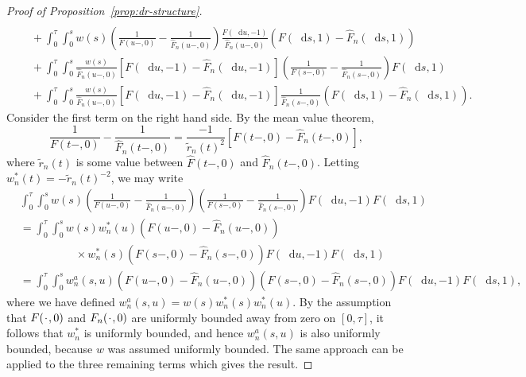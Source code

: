 \documentclass[11pt]{article}
\theoremstyle{thmstyleone}%
\theoremstyle{thmstyletwo}%
\theoremstyle{thmstylethree}%
\newcommand{\blank}{\makebox[1ex]{\textbf{$\cdot$}}}
\newcommand*\diff{\mathop{}\!\mathrm{d}}
\newcommand{\1}{\mathds{1}}
\begin{document}
\begin{proof}[Proof of Proposition~\ref{prop:dr-structure}]
\begin{align*}
      \\
      & \quad +
        \int_0^{\tau}
        \int_0^s
        w(s) 
        \left(
        \frac{1}{F(u-, 0)} -  \frac{1}{\hat{F}_n(u-, 0)}
        \right) \frac{F(\diff u, -1) }{\hat{F}_n(u-,0)}
        \left(
        F(\diff s, 1) -
        \hat{F}_n(\diff s, 1)
        \right)
      \\
      & \quad +
        \int_0^{\tau} 
        \int_0^s      
        \frac{w(s) }{\hat{F}_n(u-, 0)} 
        \left[
        F(\diff u, -1) - \hat{F}_n(\diff u, -1)
        \right]
        \left(
        \frac{1}{F(s-, 0)} -
        \frac{1}{\hat{F}_n(s-, 0)}
        \right)F(\diff s, 1)
      \\
      & \quad +
        \int_0^{\tau} 
        \int_0^s      
        \frac{w(s) }{\hat{F}_n(u-, 0)} 
        \left[
        F(\diff u, -1) - \hat{F}_n(\diff u, -1)
        \right]
        \frac{1}{\hat{F}_n(s-, 0)}
        \left(
        F(\diff s, 1) -
        \hat{F}_n(\diff s, 1)
        \right).
    \end{align*}
    \endgroup %
    Consider the first term on the right hand side. By the mean value theorem,
    \begin{equation*}
      \frac{1}{F(t-, 0)}
      - \frac{1}{\hat{F}_n(t-, 0)}
      = \frac{-1}{\tilde{r}_n(t)^2}
      \left[
        F(t-, 0)
        - \hat{F}_n(t-, 0)
      \right],
    \end{equation*}
    where \( \tilde{r}_n(t) \) is some value between \( \hat{F}(t-, 0) \) and
    \( \hat{F}_n(t-, 0) \). Letting \( w_n^*(t) = -\tilde{r}_n(t)^{-2} \), we
    may write
  \begin{align*}
    & \int_0^{\tau} 
      \int_0^s
      w(s) 
      \left(
      \frac{1}{F(u-, 0)} -  \frac{1}{\hat{F}_n(u-, 0)}
      \right)      
      \left(
      \frac{1}{F(s-, 0)} -
      \frac{1}{\hat{F}_n(s-, 0)}
      \right)F(\diff u, -1)F(\diff s, 1)
    \\
    & =
      \int_0^{\tau} 
      \int_0^s
      w(s)
      w_n^*(u) 
      \left(
      F(u-, 0) - \hat{F}_n(u-, 0)
      \right)
    \\
    & \qquad \qquad \quad
      \times
      w_n^*(s) 
      \left(
      F(s-, 0) - \hat{F}_n(s-, 0)
      \right)       
      F(\diff u, -1)F(\diff s, 1)
    \\
    & =
      \int_0^{\tau} 
      \int_0^s
      w_n^a(s,u)
      \left(
      F(u-, 0) - \hat{F}_n(u-, 0)
      \right)
      \left(
      F(s-, 0) - \hat{F}_n(s-, 0)
      \right)       
      F(\diff u, -1)F(\diff s, 1),
  \end{align*}
  where we have defined \( w_n^a(s,u) = w(s)w^*_n(s)w^*_n(u) \). By the
  assumption that \( F(\blank,0) \) and \( F_n(\blank,0) \) are uniformly
  bounded away from zero on \( [0,\tau] \), it follows that \( w_n^* \) is
  uniformly bounded, and hence \( w_n^a(s,u) \) is also uniformly bounded,
  because \( w \) was assumed uniformly bounded. The same approach can be
  applied to the three remaining terms which gives the result.
\end{proof}
\end{document}
